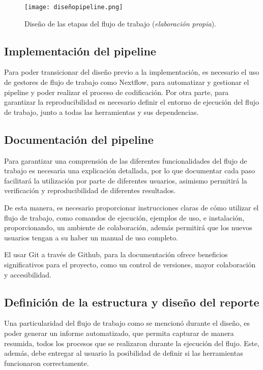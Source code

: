 \documentclass[12pt]{article}
\begin{document}
\begin{figure}[ht!]
    \centering
    \small
    \texttt{[image: diseñopipeline.png]}
    \caption{Diseño de las etapas del flujo de trabajo (\emph{elaboración propia}).}
    \label{fig:disenopipeline}
\end{figure}

\subsection*{Implementación del pipeline}

Para poder transicionar del diseño previo a la implementación, es 
necesario el uso de gestores de flujo de trabajo como Nextflow, 
para automatizar y gestionar el pipeline y poder realizar el 
proceso de codificación. Por otra parte, para garantizar la 
reproducibilidad es necesario definir el entorno de ejecución 
del flujo de trabajo, junto a todas las herramientas y sus 
dependencias.

\subsection*{Documentación del pipeline}

Para garantizar una comprensión de las diferentes funcionalidades 
del flujo de trabajo es necesaria una explicación detallada, por 
lo que documentar cada paso facilitará la utilización por parte 
de diferentes usuarios, asimismo permitirá la verificación y 
reproducibilidad de diferentes resultados.

De esta manera, es necesario proporcionar instrucciones 
claras de cómo utilizar el flujo de trabajo, como comandos 
de ejecución, ejemplos de uso, e instalación, proporcionando, un 
ambiente de colaboración, además permitirá  que los nuevos usuarios 
tengan a su haber un manual de uso completo.

El usar Git a través de Github, para la documentación ofrece 
beneficios significativos para el proyecto, como un control de 
versiones, mayor colaboración y accesibilidad.

\subsection*{Definición de la estructura y diseño del reporte}

Una particularidad del flujo de trabajo como se mencionó durante 
el diseño, es poder generar un informe automatizado, que permita 
capturar de manera resumida, todos los procesos que se realizaron 
durante la ejecución del flujo. Este, además, debe entregar  al 
usuario la posibilidad de definir si las herramientas funcionaron 
correctamente.
\end{document}
